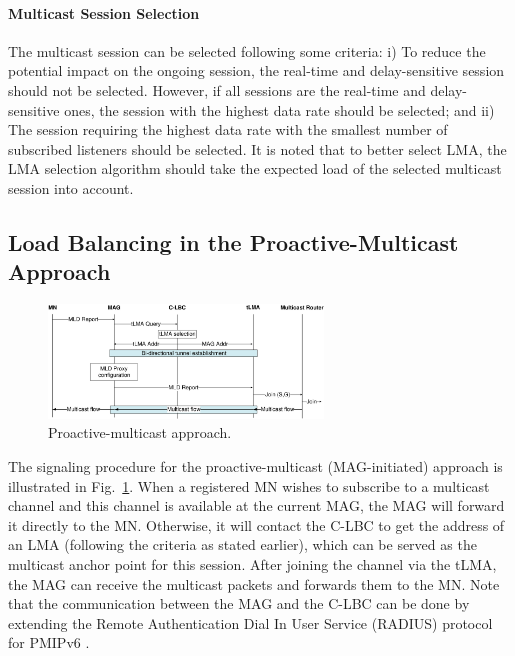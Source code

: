 \paragraph{Multicast Session Selection}
The multicast session can be selected following some criteria: i) To reduce the potential impact on the ongoing session, the real-time and delay-sensitive session should not be selected. However, if all sessions are the real-time and delay-sensitive ones, the session with the highest data rate should be selected; and ii) The session requiring the highest data rate with the smallest number of subscribed listeners should be selected. It is noted that to better select LMA, the LMA selection algorithm should take the expected load of the selected multicast session into account.
\subsection{Load Balancing in the Proactive-Multicast Approach}
\begin{figure}[h!] 
 \begin{center} 
 \includegraphics[width=0.65\textwidth]{./Part2/Chapter5/figures/c7_proactive_multicast.eps} 
    \caption[The proactive-multicast load balancing approach.]{Proactive-multicast approach.}
    \label{fig:proactive_multicast}
  \end{center} 
\end{figure}
The signaling procedure for the proactive-multicast (MAG-initiated) approach is illustrated in Fig.~\ref{fig:proactive_multicast}. When a registered MN wishes to subscribe to a multicast channel and this channel is available at the current MAG, the MAG will forward it directly to the MN. Otherwise, it will contact the C-LBC to get the address of an LMA (following the criteria as stated earlier), which can be served as the multicast anchor point for this session. After joining the channel via the tLMA, the MAG can receive the multicast packets and forwards them to the MN. Note that the communication between the MAG and the C-LBC can be done by extending the Remote Authentication Dial In User Service (RADIUS) protocol for PMIPv6 \cite{radius}.

